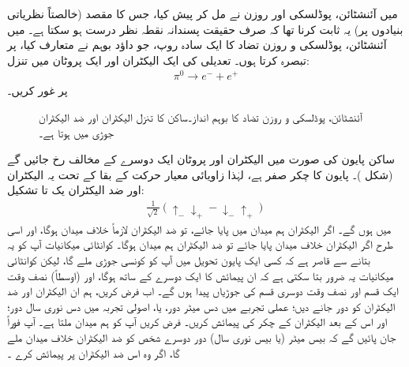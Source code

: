 میں آئنشٹائن،  پوڈلسکی اور روزن نے مل کر   پیش کیا، جس کا مقصد (خالصتاً نظریاتی بنیادوں پر)  یہ ثابت کرنا تھا کہ صرف حقیقت پسندانہ  نقطہ نظر درست ہو سکتا ہے۔ میں آئنشٹائن، پوڈلسکی و  روزن  تضاد کا  ایک سادہ روپ،  جو  داؤد بوہم نے  متعارف کیا،  پر تبصرہ کرتا ہوں۔ تعدیلی    کی ایک الیکٹران اور ایک پروٹان میں  تنزل:
\begin{align*}
	\pi^0\to e^{-}+e^{+}
\end{align*}
 پر غور کریں۔
\begin{figure}
\centering
{}
\caption{آئنشٹائن، پوڈلسکی و  روزن  تضاد کا بوہم انداز۔ساکن   کا تنزل الیکٹران اور   ضد الیکٹران  جوڑی میں ہوتا ہے۔}
\label{شکل_بکھراو_بوہم_تنزل}
\end{figure}
%
ساکن پایون کی صورت میں الیکٹران اور پروٹان ایک دوسرے کے مخالف رخ جائیں گے (شکل )۔   پایون کا چکر صفر ہے،  لہٰذا زاویائی معیار حرکت کے  بقا کے تحت یہ الیکٹران اور ضد الیکٹران  یک تا تشکیل:
\begin{align}\label{مساوات_پس_ہمبستہ}
	\frac{1}{\sqrt{2}}(\uparrow_{-}\downarrow_{+}-\downarrow_{-}\uparrow_{+})
\end{align}
  میں ہوں گے۔ اگر  الیکٹران ہم میدان میں پایا جائے،  تو  ضد الیکٹران لازماً خلاف میدان ہوگا،   اور اسی طرح اگر الیکٹران خلاف میدان پایا جائے تو ضد الیکٹران ہم میدان ہوگا۔ کوانٹائی میکانیات آپ کو یہ بتانے سے قاصر ہے کہ کسی ایک  پایون تحویل میں آپ کو کونسی جوڑی   ملے گا،  لیکن کوانٹائی میکانیات یہ ضرور بتا سکتی ہے کہ ان پیمائش کا ایک دوسرے کے ساتھ   ہوگا،  اور  (اوسطاً)  نصف وقت ایک قسم اور نصف وقت دوسری قسم کی جوڑیاں پیدا ہوں گے۔ اب فرض کریں،  ہم ان الیکٹران اور ضد الیکٹران کو دور جانے دیں؛   عملی تجربے  میں  دس میٹر دور، یا،  اصولی تجربہ میں دس نوری سال  دور؛  اور اس کے بعد الیکٹران کے چکر کی پیمائش کریں۔ فرض کریں آپ کو ہم میدان ملتا ہے۔ آپ فوراً جان پائیں گے کہ بیس میٹر  (یا بیس نوری سال)  دور  دوسرے  شخص کو   ضد الیکٹران  خلاف میدان ملے  گا، اگر وہ  اس ضد الیکٹران پر پیمائش کرے ۔
  
